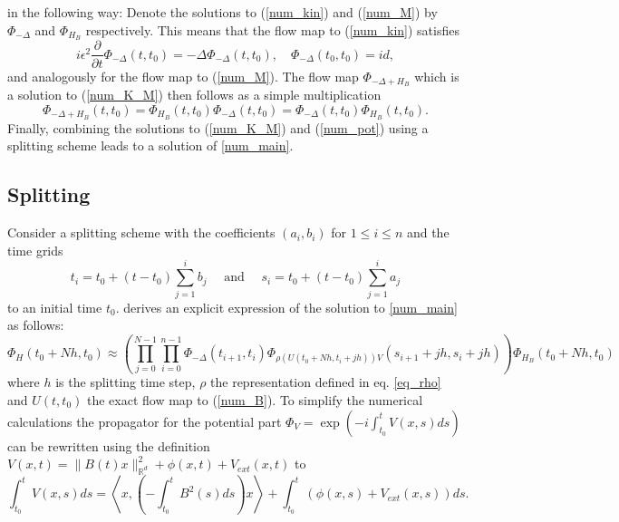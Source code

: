\documentclass{article}
\begin{document}
in the following way: Denote the solutions to (\ref{num_kin}) and (\ref{num_M}) by $\Phi_{-\Delta}$ and $\Phi_{H_B}$ respectively. This means that the flow map to (\ref{num_kin}) satisfies
\begin{equation}
  i \epsilon^2 \frac{\partial}{\partial t}\Phi_{-\Delta}(t, t_0) = -\Delta \Phi_{-\Delta}(t, t_0), \quad \Phi_{-\Delta}(t_0, t_0) = id,
\end{equation}
and analogously for the flow map to (\ref{num_M}). The flow map $\Phi_{-\Delta + H_B}$ which is a solution to (\ref{num_K_M}) then follows as a simple multiplication
\begin{equation}
  \Phi_{-\Delta + H_B}(t, t_0) = \Phi_{H_B}(t, t_0)\Phi_{-\Delta}(t, t_0) = \Phi_{-\Delta}(t, t_0)\Phi_{H_B}(t, t_0).
\end{equation}
Finally, combining the solutions to (\ref{num_K_M}) and (\ref{num_pot}) using a splitting scheme leads to a solution of \ref{num_main}.

\subsection{Splitting}
Consider a splitting scheme with the coefficients $(a_i, b_i)$ for $1 \leq i \leq n$ and the time grids
\begin{equation}
  t_{i}=t_{0}+\left(t-t_{0}\right) \sum_{j=1}^{i} b_{j} \quad \text { and } \quad s_{i}=t_{0}+\left(t-t_{0}\right) \sum_{j=1}^{i} a_{j}
\end{equation}
to an initial time $t_0$. \cite{paper_orvg} derives an explicit expression of the solution to \ref{num_main} as follows:
\begin{equation} \label{eq:timesteps}
  \Phi_{H}\left(t_{0}+N h, t_{0}\right) \approx\left(\prod_{j=0}^{N-1} \prod_{i=0}^{n-1} \Phi_{-\Delta}\left(t_{i+1}, t_{i}\right) \Phi_{\rho\left(U\left(t_{0}+N h, t_{i}+j h\right)\right) V}\left(s_{i+1}+j h, s_{i}+j h\right)\right) \Phi_{H_{B}}\left(t_{0}+N h, t_{0}\right)
\end{equation}
where $h$ is the splitting time step, $\rho$ the representation defined in eq. \ref{eq_rho} and $U(t, t_0)$ the exact flow map to (\ref{num_B}). \newline
To simplify the numerical calculations the propagator for the potential part $\Phi_{V} = \exp(-i \int_{t_0}^t V(x, s)ds)$ can be rewritten using the definition $V(x, t) = \lVert{B(t)x}\rVert_{\mathbb{R}^d}^2 + \phi(x,t) + V_{ext}(x,t)$ to
\begin{equation} \label{eq:rotinv}
  \int_{t_0}^t V(x, s) ds = \left\langle x, \left( -\int _{t_0}^t B^2(s)ds\right)x \right\rangle + \int _{t_0}^t \left( \phi(x, s) + V_{ext}(x, s)  \right) ds.
\end{equation}
\end{document}
